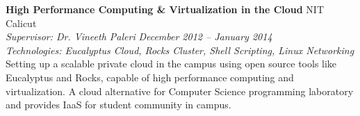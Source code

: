 \documentclass[margin,line]{resume}
\begin{document}
\begin{resume}
    \textbf{High Performance Computing \& Virtualization in the Cloud} 				\hfill NIT Calicut \\
      \textit{Supervisor: Dr. Vineeth Paleri } 			\hfill \textit{December 2012 -- January 2014}\\
      \textit{Technologies: Eucalyptus Cloud, Rocks Cluster, Shell Scripting, Linux Networking}\\
    Setting up a scalable private cloud in the campus using open source tools like Eucalyptus and Rocks,
capable of high performance computing and virtualization.  A cloud alternative for Computer Science
programming laboratory and provides IaaS for student community in campus.
	\vspace{2mm}%
%
%   
%   
%   
%    
      
      
   

%
%   
%	
%	
%	 
\pagebreak

\end{resume}
\end{document}
